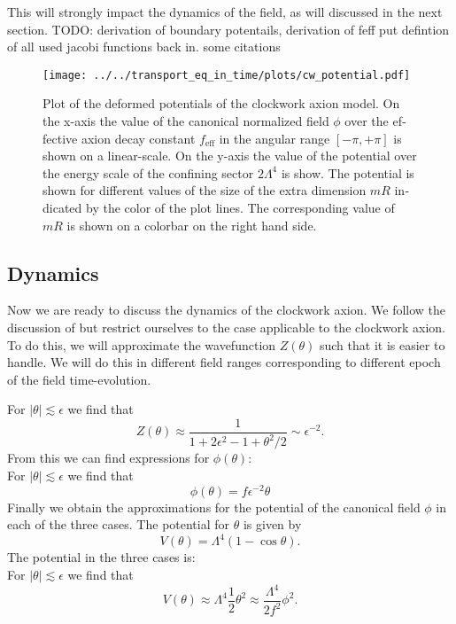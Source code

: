 \documentclass[master,       %
               twoside,        %
               BCOR10mm,       %
               english,ngerman, %
               ]{GAUBM}
\begin{document}
\begin{otherlanguage}{english}
This will strongly impact the dynamics of the field, as will discussed in the next section.
TODO: derivation of boundary potentails, derivation of feff
put defintion of all used jacobi functions back in.
some citations 
\begin{figure}[H]
	\label{fig:clockwork_pot_plot}
    \texttt{[image: ../../transport\_eq\_in\_time/plots/cw\_potential.pdf]}
    \caption{Plot of the deformed potentials of the clockwork axion model. On the x-axis the value of the canonical normalized field $\phi$ over the effective axion decay constant $f_\mathrm{eff}$ in the angular range $[-\pi, +\pi]$ is shown on a linear-scale. On the y-axis the value of the potential over the energy scale of the confining sector $2 \Lambda^4$ is show. The potential is shown for different values of the size of the extra dimension $mR$ indicated by the color of the plot lines. The corresponding value of $mR$ is shown on a colorbar on the right hand side.}
\end{figure}

\subsection{Dynamics}
Now we are ready to discuss the dynamics of the clockwork axion.
We follow the discussion of \cite{Deformed_potential_Bae_2019} but restrict ourselves to the case applicable to the clockwork axion.
To do this, we will approximate the wavefunction $Z(\theta)$ such that it is easier to handle. We will do this in different field ranges corresponding to different epoch of the field time-evolution.

For $|\theta| \lesssim \epsilon$ we find that
\begin{equation}
	Z(\theta) \approx \frac{1}{1 + 2\epsilon^2 - 1 + \theta^2/2} \sim \epsilon^{-2}.
\end{equation}
From this we can find expressions for $\phi(\theta)$: \\
For $|\theta| \lesssim \epsilon$ we find that
\begin{equation}
	\phi(\theta) = f \epsilon^{-2} \theta
\end{equation}
Finally we obtain the approximations for the potential of the canonical field $\phi$ in each of the three cases. The potential for $\theta$ is given by 
\begin{equation}
	V(\theta) = \Lambda^4(1 - \cos \theta).
\end{equation}
The potential in the three cases is: \\
For $|\theta| \lesssim \epsilon$ we find that
\begin{equation}
	V(\theta) \approx \Lambda^4 \frac{1}{2} \theta^2 \approx \frac{\Lambda^4}{2 f^2} \phi^2.
\end{equation}



\end{otherlanguage}
\end{document}
